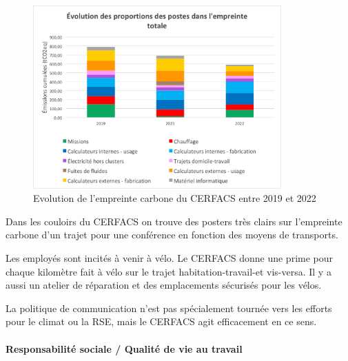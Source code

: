     \begin{figure}[H]
        \centering
        \includegraphics[width=0.85\textwidth]{images/evolution_postes_empreintecarbone.png}
        \caption{Evolution de l'empreinte carbone du CERFACS entre 2019 et 2022}
        \label{fig:evolution_empreinte_carbone}
    \end{figure}

    Dans les couloirs du CERFACS on trouve des posters très clairs sur l'empreinte carbone d'un trajet pour une conférence en fonction des moyens de transports.

    Les employés sont incités à venir à vélo. Le CERFACS donne une prime pour chaque kilomètre fait à vélo sur le trajet habitation-travail-et vis-versa. Il y a aussi un atelier de réparation et des emplacements sécurisés pour les vélos.

    La politique de communication n'est pas spécialement tournée vers les efforts pour le climat ou la RSE, mais le CERFACS agit efficacement en ce sens.

\paragraph{Responsabilité sociale / Qualité de vie au travail}
\hspace{0,5cm}

